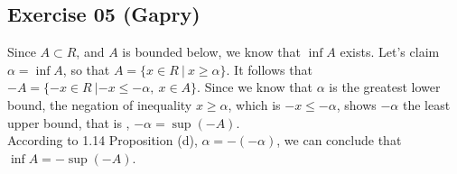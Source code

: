 \subsection*{Exercise 05 (Gapry)}

\begin{flushleft}
Since $A \subset R$, and $A$ is bounded below, we know that $\inf A$ exists.
Let's claim $\alpha = \inf A$, so that $A = \{x \in R\ |\ x \ge \alpha \}$. 
It follows that $-A = \{-x \in R\ | -x \le -\alpha,\ x \in A\}$. 
Since we know that $\alpha$ is the greatest lower bound, 
the negation of inequality $x \ge \alpha$, which is $-x \le -\alpha$, shows $-\alpha$ the least upper bound, that is , $-\alpha = \sup(-A)$. \\

According to 1.14 Proposition (d), $\alpha = -(-\alpha)$, we can conclude that $\inf A = -\sup(-A)$.
\end{flushleft}
